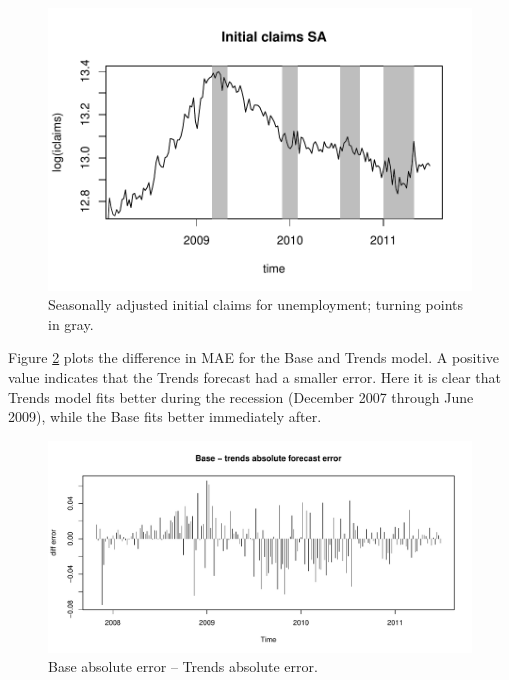 \documentclass[12pt, oneside]{article}
\begin{document}
\begin{figure}[ht]
\begin{center}
\includegraphics[width=5.5in]{iclaims}
\caption{\label{Fig:iclaims} Seasonally adjusted initial claims for unemployment; turning points in gray.} 
\end{center}
\end{figure}

Figure \ref{Fig:error} plots the difference in MAE for the Base and Trends
model.  A positive value indicates that the Trends forecast had a
smaller error.  Here it is clear that Trends model fits better during
the recession (December 2007 through June 2009), while the Base fits
better immediately after.


\begin{figure}[ht]
\begin{center}
\includegraphics[width=5.5in]{error.pdf}
\caption{\label{Fig:error} Base absolute error -- Trends absolute error.} 
\end{center}
\end{figure}
\end{document}
